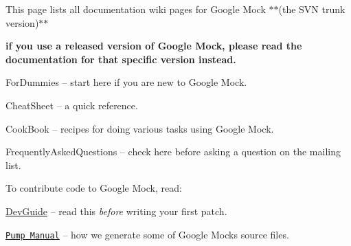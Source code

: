 This page lists all documentation wiki pages for Google Mock $\ast$$\ast$(the S\+VN trunk version)$\ast$$\ast$
\begin{DoxyItemize}
\item {\bfseries if you use a released version of Google Mock, please read the documentation for that specific version instead.}
\begin{DoxyItemize}
\item For\+Dummies -- start here if you are new to Google Mock.
\item Cheat\+Sheet -- a quick reference.
\item Cook\+Book -- recipes for doing various tasks using Google Mock.
\item Frequently\+Asked\+Questions -- check here before asking a question on the mailing list.
\end{DoxyItemize}
\end{DoxyItemize}

To contribute code to Google Mock, read\+:


\begin{DoxyItemize}
\item \hyperlink{googletest_2docs_2DevGuide_8md}{Dev\+Guide} -- read this {\itshape before} writing your first patch.
\item \href{http://code.google.com/p/googletest/wiki/PumpManual}{\tt Pump Manual} -- how we generate some of Google Mock\textquotesingle{}s source files. 
\end{DoxyItemize}